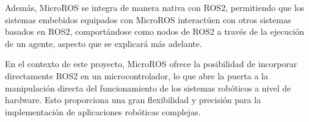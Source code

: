 Además, MicroROS se integra de manera nativa con ROS2, permitiendo que los sistemas embebidos equipados con MicroROS interactúen con otros sistemas basados en ROS2, comportándose como nodos de ROS2 a través de la ejecución de un agente, aspecto que se explicará más adelante.



En el contexto de este proyecto, MicroROS ofrece la posibilidad de incorporar directamente ROS2 en un microcontrolador, lo que abre la puerta a la manipulación directa del funcionamiento de los sistemas robóticos a nivel de hardware. Esto proporciona una gran flexibilidad y precisión para la implementación de aplicaciones robóticas complejas.